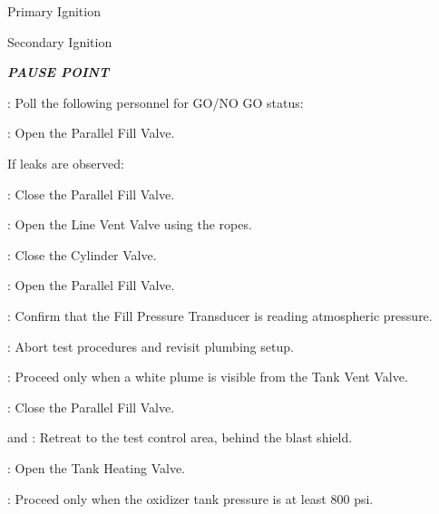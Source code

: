 \begin{checklist}
\begin{checklist}
        \item Primary Ignition
        \item Secondary Ignition
    \end{checklist}
    \item \textbf{\textit{PAUSE POINT}}
    \item \ops{}: Poll the following personnel for GO/NO GO status:
    \begin{checklist}
        \item \peri{}
        \item \perii{}
        \item \periii{}
        \item \heat
        \item \daq{}
        \item \primary{}
        \item \secondary
    \end{checklist}
    \item \primary{}: Open the Parallel Fill Valve.
    \begin{checklist}[label=$\bullet$]
        \item If leaks are observed:
        \begin{checklist}
            \item \primary{}: Close the Parallel Fill Valve.
            \item \primary{}: Open the Line Vent Valve using the ropes.
            \item \primary{}: Close the Cylinder Valve.
            \item \primary{}: Open the Parallel Fill Valve.
            \item \daq{}: Confirm that the Fill Pressure Transducer is reading atmospheric pressure.
            \item \ops{}: Abort test procedures and revisit plumbing setup.
        \end{checklist}
    \end{checklist}
    \item \secondary{}: Proceed only when a white plume is visible from the Tank Vent Valve.
    \item \primary{}: Close the Parallel Fill Valve.
    \item \primary{} and \secondary: Retreat to the test control area, behind the blast shield.
    \item \heat: Open the Tank Heating Valve.
    \item \daq{}: Proceed only when the oxidizer tank pressure is at least 800 psi.

\end{checklist}
